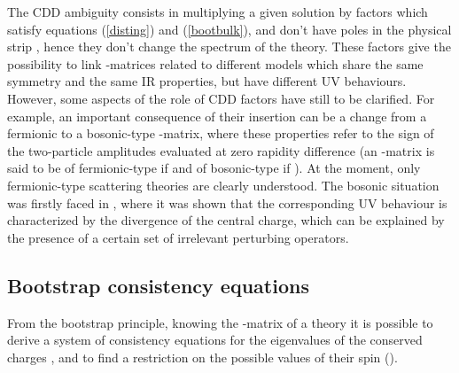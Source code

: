 \documentclass[a4paper,12pt]{report}
\begin{document}
The CDD ambiguity consists in multiplying a given solution by factors which satisfy equations (\ref{disting}) and
(\ref{bootbulk}), and don't have poles in the physical strip \coordHE{}, hence they don't
change the spectrum of the theory. These factors give the possibility to link \coordHE{}-matrices related to different
models which share the same symmetry and the same IR properties, but have different UV behaviours. However, some
aspects of the role of CDD factors have still to be clarified. For example, an important consequence of their
insertion can be a change from a fermionic to a bosonic-type \coordHE{}-matrix, where these properties refer to the sign
of the two-particle amplitudes \coordHE{} evaluated at zero rapidity difference (an \coordHE{}-matrix is said to be of
fermionic-type if \coordHE{} and of bosonic-type if \coordHE{}). At the moment, only fermionic-type
scattering theories are clearly understood. The bosonic situation was firstly faced in \cite{musssim}, where it
was shown that the corresponding UV behaviour is characterized by the divergence of the central charge, which can
be explained by the presence of a certain set of irrelevant perturbing operators.





\subsection{Bootstrap consistency equations}

From the bootstrap principle, knowing the \coordHE{}-matrix of a theory it is possible to derive a system of consistency
equations for the eigenvalues of the conserved charges \coordHE{}, and to find a restriction on the possible values
of their spin \coordHE{} (\cite{sbrind}).
\end{document}
